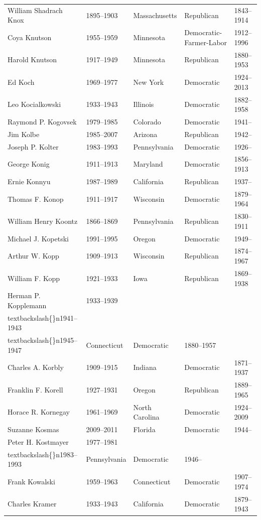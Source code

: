 \documentclass{article}
\begin{document}
\begin{tabular}{lllll}
William Shadrach Knox & 1895–1903 & Massachusetts & Republican & 1843–1914 \\
Coya Knutson & 1955–1959 & Minnesota & Democratic-Farmer-Labor & 1912–1996 \\
Harold Knutson & 1917–1949 & Minnesota & Republican & 1880–1953 \\
Ed Koch & 1969–1977 & New York & Democratic & 1924–2013 \\
Leo Kocialkowski & 1933–1943 & Illinois & Democratic & 1882–1958 \\
Raymond P. Kogovsek & 1979–1985 & Colorado & Democratic & 1941– \\
Jim Kolbe & 1985–2007 & Arizona & Republican & 1942– \\
Joseph P. Kolter & 1983–1993 & Pennsylvania & Democratic & 1926– \\
George Konig & 1911–1913 & Maryland & Democratic & 1856–1913 \\
Ernie Konnyu & 1987–1989 & California & Republican & 1937– \\
Thomas F. Konop & 1911–1917 & Wisconsin & Democratic & 1879–1964 \\
William Henry Koontz & 1866–1869 & Pennsylvania & Republican & 1830–1911 \\
Michael J. Kopetski & 1991–1995 & Oregon & Democratic & 1949– \\
Arthur W. Kopp & 1909–1913 & Wisconsin & Republican & 1874–1967 \\
William F. Kopp & 1921–1933 & Iowa & Republican & 1869–1938 \\
Herman P. Kopplemann & 1933–1939\\textbackslash\{\}n1941–1943\\textbackslash\{\}n1945–1947 & Connecticut & Democratic & 1880–1957 \\
Charles A. Korbly & 1909–1915 & Indiana & Democratic & 1871–1937 \\
Franklin F. Korell & 1927–1931 & Oregon & Republican & 1889–1965 \\
Horace R. Kornegay & 1961–1969 & North Carolina & Democratic & 1924–2009 \\
Suzanne Kosmas & 2009–2011 & Florida & Democratic & 1944– \\
Peter H. Kostmayer & 1977–1981\\textbackslash\{\}n1983–1993 & Pennsylvania & Democratic & 1946– \\
Frank Kowalski & 1959–1963 & Connecticut & Democratic & 1907–1974 \\
Charles Kramer & 1933–1943 & California & Democratic & 1879–1943 \\

\end{tabular}
\end{document}

